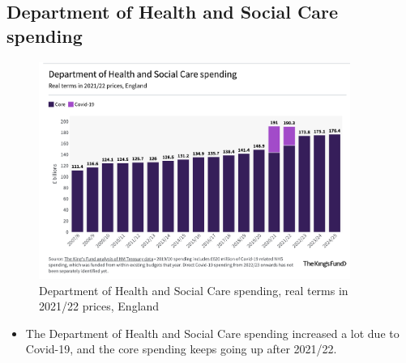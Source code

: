         \subsection{Department of Health and Social Care spending} 
        \begin{figure}[H]%
                \centering
                \includegraphics[width=4in]{images/ch3/7.png}
                \caption{Department of Health and Social Care spending, real terms in 2021/22 prices, England}
                \label{fig:label}
            \end{figure} 
\begin{itemize}           
        \item The Department of Health and Social Care spending increased a lot due to Covid-19, and the core spending keeps going up after 2021/22.
        \end{itemize}        

